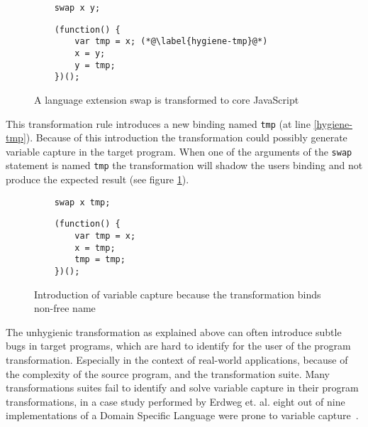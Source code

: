 \begin{figure}[!h]
\begin{minipage}{0.45\textwidth}
	\begin{lstlisting}
	swap x y;
	\end{lstlisting}
\end{minipage}
\hfill
\begin{minipage}{0.45\textwidth}
	\begin{lstlisting}
	(function() {
		var tmp = x; (*@\label{hygiene-tmp}@*)
		x = y;
		y = tmp;
	})();
	\end{lstlisting}
\end{minipage}

\caption{A language extension swap is transformed to core JavaScript}
\end{figure}

This transformation rule introduces a new binding named \lstinline$tmp$ (at line \ref{hygiene-tmp}). Because of this introduction the transformation could possibly generate variable capture in the target program. When one of the arguments of the \lstinline$swap$ statement is named \lstinline$tmp$ the transformation will shadow the users binding and not produce the expected result (see figure \ref{fig:unhygienic}).

\begin{figure}[!h]
\label{fig:unhygienic}
\begin{minipage}{0.45\textwidth}
	\begin{lstlisting}
	swap x tmp;
	\end{lstlisting}
\end{minipage}
\hfill
\begin{minipage}{0.45\textwidth}
	\begin{lstlisting}
	(function() {
		var tmp = x;
		x = tmp;
		tmp = tmp;
	})();
	\end{lstlisting}
\end{minipage}
\caption{Introduction of variable capture because the transformation binds non-free name}
\end{figure}

The unhygienic transformation as explained above can often introduce subtle bugs in target programs, which are hard to identify for the user of the program transformation. Especially in the context of real-world applications, because of the complexity of the source program, and the transformation suite. Many transformations suites fail to identify and solve variable capture in their program transformations, in a case study performed by Erdweg et. al. eight out of nine implementations of a Domain Specific Language were prone to variable capture~\cite{Erdweg2014a}.

